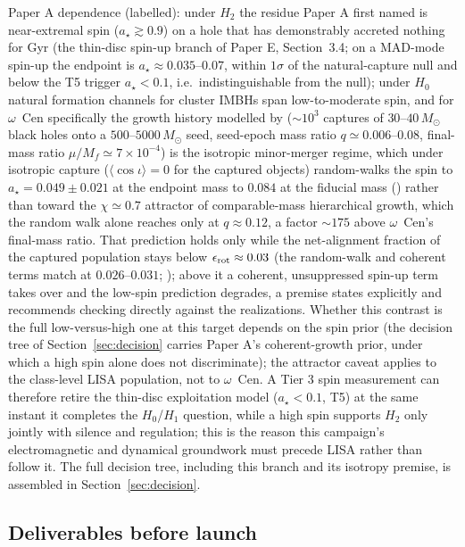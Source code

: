\documentclass[11pt]{article}
\newcommand{\msun}{\ensuremath{M_\odot}}
\newcommand{\astar}{\ensuremath{a_\star}}
\newcommand{\ocen}{\ensuremath{\omega}~Cen}
\begin{document}
Paper A dependence (labelled): under $H_2$ the residue Paper A first named is near-extremal spin ($\astar \gtrsim 0.9$) on a hole that has demonstrably accreted nothing for Gyr (the thin-disc spin-up branch of Paper E, Section~3.4; on a MAD-mode spin-up the endpoint is $\astar \approx 0.035$--$0.07$, within $1\sigma$ of the natural-capture null and below the T5 trigger $\astar < 0.1$, i.e.\ indistinguishable from the null); under $H_0$ natural formation channels for cluster IMBHs span low-to-moderate spin, and for \ocen{} specifically the growth history modelled by \citet{GonzalezPrieto2025} ($\sim$$10^{3}$ captures of $30$--$40\,\msun$ black holes onto a $500$--$5000\,\msun$ seed, seed-epoch mass ratio $q \simeq 0.006$--$0.08$, final-mass ratio $\mu/M_f \simeq 7\times10^{-4}$) is the isotropic minor-merger regime, which under isotropic capture ($\langle\cos\iota\rangle = 0$ for the captured objects) random-walks the spin to $\astar = 0.049\pm0.021$ at the endpoint mass to $0.084$ at the fiducial mass (\citealt{Swanson2026Engineered}) rather than toward the $\chi \simeq 0.7$ attractor of comparable-mass hierarchical growth, which the random walk alone reaches only at $q \approx 0.12$, a factor $\sim 175$ above \ocen's final-mass ratio. That prediction holds only while the net-alignment fraction of the captured population stays below $\epsilon_{\rm rot} \approx 0.03$ (the random-walk and coherent terms match at $0.026$--$0.031$; \citealt{Swanson2026Engineered}); above it a coherent, unsuppressed spin-up term takes over and the low-spin prediction degrades, a premise \citet{Swanson2026Engineered} states explicitly and recommends checking directly against the \citet{GonzalezPrieto2025} realizations. Whether this contrast is the full low-versus-high one at this target depends on the spin prior (the decision tree of Section~\ref{sec:decision} carries Paper A's coherent-growth prior, under which a high spin alone does not discriminate); the attractor caveat applies to the class-level LISA population, not to \ocen{}. A Tier 3 spin measurement can therefore retire the thin-disc exploitation model ($\astar < 0.1$, T5) at the same instant it completes the $H_0$/$H_1$ question, while a high spin supports $H_2$ only jointly with silence and regulation; this is the reason this campaign's electromagnetic and dynamical groundwork must precede LISA rather than follow it. The full decision tree, including this branch and its isotropy premise, is assembled in Section~\ref{sec:decision}.

\subsection{Deliverables before launch}
\end{document}
